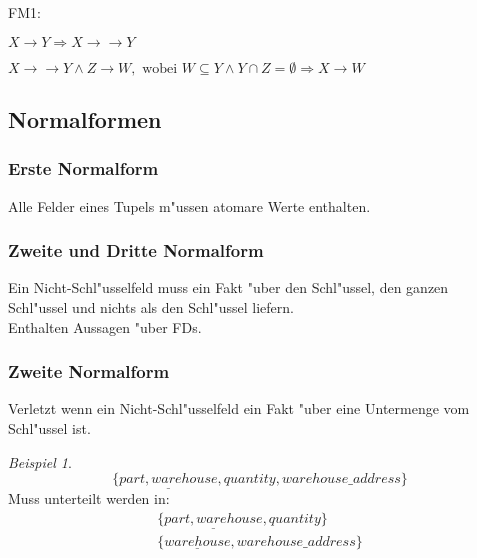 \documentclass[german, 10pt, a4paper, twocolumn]{scrartcl}
\theoremstyle{definition}
\theoremstyle{remark}
\theoremstyle{example}
\newtheorem{example}{Beispiel}[subsection]
\begin{document}
\begin{labeling}{ FM1:}
	\item[\usekomafont{descriptionlabel} FM1:] $X \rightarrow Y \Rightarrow X \rightarrow\rightarrow Y$
	\item[\usekomafont{descriptionlabel} FM2:] $X \rightarrow\rightarrow Y \land Z \rightarrow W, \mbox{ wobei } W \subseteq Y \land Y \cap Z = \emptyset \Rightarrow X \rightarrow W$
\end{labeling}


\subsection{Normalformen}


\subsubsection{Erste Normalform}

Alle Felder eines Tupels m"ussen atomare Werte enthalten.


\subsubsection{Zweite und Dritte Normalform}

Ein Nicht-Schl"usselfeld muss ein Fakt "uber den Schl"ussel, den ganzen Schl"ussel und nichts als den Schl"ussel liefern.\\

Enthalten Aussagen "uber FDs.


\subsubsection{Zweite Normalform}

Verletzt wenn ein Nicht-Schl"usselfeld ein Fakt "uber eine Untermenge vom Schl"ussel ist.\\

\begin{example}\ 
	\begin{displaymath}
		\{ \underline{part, warehouse}, quantity, warehouse\_address \}
	\end{displaymath}
	Muss unterteilt werden in:
	\begin{displaymath}
		\begin{array}{c}
			\{\underline{part, warehouse}, quantity\}\\
			\{\underline{warehouse}, warehouse\_address\}
		\end{array}
	\end{displaymath}
\end{example}
\end{document}
